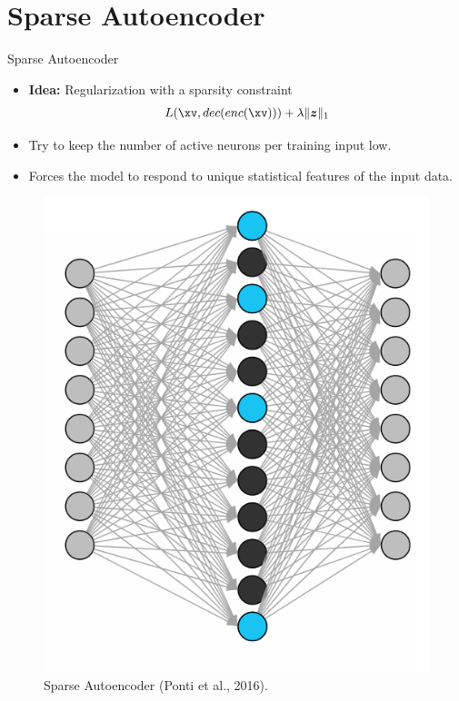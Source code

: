 \section{Sparse Autoencoder}

\begin{vbframe}{Sparse Autoencoder}

\begin{itemize}
  \item \textbf{Idea:} Regularization with a sparsity constraint
  $$
    L(\xv, dec(enc(\xv))) + \lambda \|\bm{z}\|_1 
  $$
\item Try to keep the number of active neurons per training input low. 
\item Forces the model to respond to unique statistical features of the input data. 
\end{itemize}

\vspace*{-0.3cm}

\begin{figure}[h]
    \centering
    \includegraphics[width=0.25\linewidth]{plots/AE_sparse.png}
    \caption{Sparse Autoencoder (Ponti et al., 2016).} 
\end{figure}

\end{vbframe}


